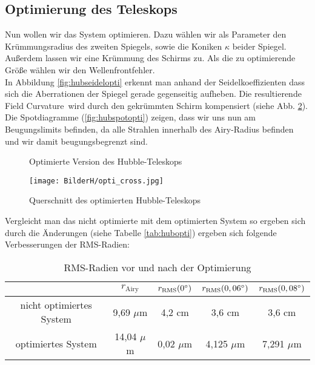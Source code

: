 \documentclass[twoside,colorback,accentcolor=tud4c,11pt]{tudreport}
\begin{document}
\subsection{Optimierung des Teleskops}
Nun wollen wir das System optimieren. Dazu wählen wir als Parameter den Krümmungsradius des zweiten Spiegels, sowie die Koniken $ \kappa $ beider Spiegel. Außerdem lassen wir eine Krümmung des Schirms zu. Als die zu optimierende Größe wählen wir den Wellenfrontfehler. \\
In Abbildung \ref{fig:hubseidelopti} erkennt man anhand der Seidelkoeffizienten dass sich die Aberrationen der Spiegel gerade gegenseitig aufheben. Die resultierende \glqq Field Curvature\grqq\, wird durch den gekrümmten Schirm kompensiert (siehe Abb. \ref{fig:hubcrossopti}). Die Spotdiagramme (\ref{fig:hubspotopti}) zeigen, dass wir uns nun am Beugungslimits befinden, da alle Strahlen innerhalb des Airy-Radius befinden und wir damit beugungsbegrenzt sind.
\begin{figure}[H]
\centering
  \quad
  \quad   
  \caption{Optimierte Version des Hubble-Teleskops}
  \label{fig:hubopti}
  
\end{figure}
\begin{figure}[H]
\centering
   	\begin{minipage}[b]{\textwidth}
   	\texttt{[image: BilderH/opti\_cross.jpg]}
   	\caption{Querschnitt des optimierten Hubble-Teleskops}
  	\label{fig:hubcrossopti}
   	\end{minipage}
\end{figure}
Vergleicht man das nicht optimierte mit dem optimierten System so ergeben sich durch die Änderungen (siehe Tabelle \ref{tab:hubopti}) ergeben sich folgende Verbesserungen der RMS-Radien:

\begin{table}[H]
\centering
\begin{tabular}{|c|c|c|c|c|}
\hline 
 & $r_{\text{Airy}}$ & $r_{\text{RMS}}(0\degree)$ & $r_{\text{RMS}}(0,06\degree)$ & $r_{\text{RMS}}(0,08\degree)$ \\ 
\hline 
nicht optimiertes System & 9,69 $\mu$m & 4,2 cm & 3,6 cm & 3,6 cm \\ 
\hline 
optimiertes System & 14,04 $\mu$m & 0,02 $\mu$m & 4,125 $\mu$m & 7,291 $\mu$m \\ 
\hline 
\end{tabular} 
\caption{RMS-Radien vor und nach der Optimierung}
\end{table}
\end{document}
